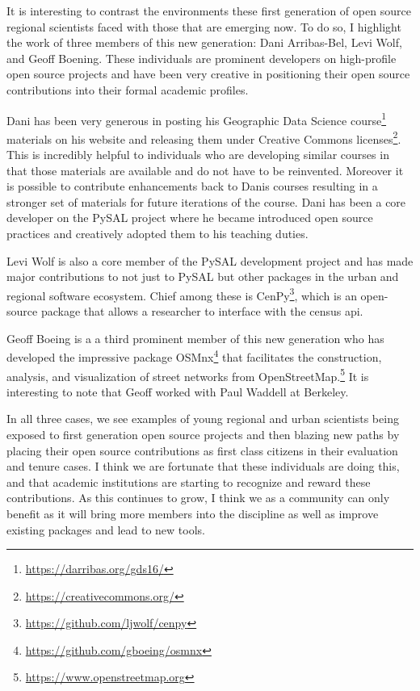 \documentclass[11pt]{article}
\begin{document}
It is interesting to contrast the environments these first generation of open
source regional scientists faced with those that are emerging now. To do so, I
highlight the work of three members of this new generation: Dani Arribas-Bel,
Levi Wolf, and Geoff Boening. These individuals are prominent developers on
high-profile open source projects and have been very creative in positioning
their open source contributions into their formal academic profiles.

Dani has been very generous in posting his Geographic Data Science course\footnote{\url{https://darribas.org/gds16/}}
materials on his website and releasing them under Creative Commons
licenses\footnote{\url{https://creativecommons.org/}}.  This is incredibly helpful to individuals who are developing
similar courses in that those materials are available and do not have to be
reinvented. Moreover it is possible to contribute enhancements back to Danis
courses resulting in a stronger set of materials for future iterations of the
course. Dani has been a core developer on the PySAL project where he became
introduced open source practices and creatively adopted them to his teaching
duties.


Levi Wolf is also a core member of the PySAL development project and has made
major contributions to not just to PySAL but other packages in the urban and
regional software ecosystem. Chief among these is CenPy\footnote{\url{https://github.com/ljwolf/cenpy}}, which is an
open-source package that allows a researcher to interface with the census api.

Geoff Boeing is a a third prominent member of this new generation who has
developed the impressive package OSMnx\footnote{\url{https://github.com/gboeing/osmnx}} that facilitates the
construction, analysis, and visualization of street networks from
OpenStreetMap.\footnote{\url{https://www.openstreetmap.org}} It is interesting to note that Geoff worked with Paul
Waddell at Berkeley.

In all three cases, we see examples of young regional and urban scientists
being exposed to first generation open source projects and then blazing new
paths by placing their open source contributions as first class citizens in
their evaluation and tenure cases. I think we are fortunate that these
individuals are doing this, and that academic institutions are starting to
recognize and reward these contributions. As this continues to grow, I think we
as a community can only benefit as it will bring more members into the
discipline as well as improve existing packages and lead to new tools.
\end{document}
